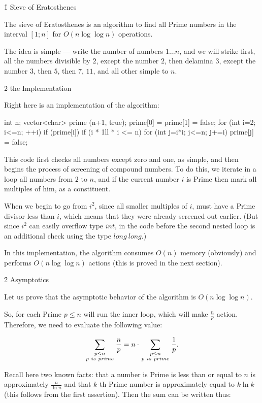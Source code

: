 \h1{ Sieve of Eratosthenes }

The sieve of Eratosthenes is an algorithm to find all Prime numbers in the interval $[1; n]$ for $O (n \log \log n)$ operations.

The idea is simple --- write the number of numbers $1 \ldots n$, and we will strike first, all the numbers divisible by $2$, except the number $2$, then delamina $3$, except the number $3$, then $5$, then $7$, $11$, and all other simple to $n$.


\h2{ the Implementation }

Right here is an implementation of the algorithm:

\code
int n;
vector<char> prime (n+1, true);
prime[0] = prime[1] = false;
for (int i=2; i<=n; ++i)
if (prime[i])
if (i * 1ll * i <= n)
for (int j=i*i; j<=n; j+=i)
prime[j] = false;
\endcode

This code first checks all numbers except zero and one, as simple, and then begins the process of screening of compound numbers. To do this, we iterate in a loop all numbers from $2$ to $n$, and if the current number $i$ is Prime then mark all multiples of him, as a constituent.

When we begin to go from $i^2$, since all smaller multiples of $i$, must have a Prime divisor less than $i$, which means that they were already screened out earlier. (But since $i^2$ can easily overflow type $int$, in the code before the second nested loop is an additional check using the type $long~long$.)

In this implementation, the algorithm consumes $O (n)$ memory (obviously) and performs $O (n \log \log n)$ actions (this is proved in the next section).


\h2{ Asymptotics }

Let us prove that the asymptotic behavior of the algorithm is $O (n \log \log n)$.

So, for each Prime $p \le n$ will run the inner loop, which will make $\frac{n}{p}$ action. Therefore, we need to evaluate the following value:

$$ \sum_{ \scriptstyle p \le n \atop\scriptstyle p~is~prime } \frac{n}{p} = n \cdot \sum_{ \scriptstyle p \le n \atop\scriptstyle p~is~prime } \frac{1}{p}. $$

Recall here two known facts: that a number is Prime is less than or equal to $n$ is approximately $\frac{n}{\ln n}$ and that $k$-th Prime number is approximately equal to $k \ln k$ (this follows from the first assertion). Then the sum can be written thus:

